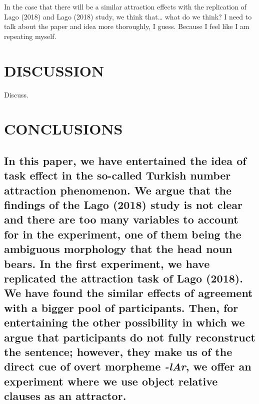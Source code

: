 \documentclass[doc]{apa6}
\begin{document}
In the case that there will be a similar attraction effects with the
replication of Lago (2018) and Lago (2018) study, we think that\ldots{}
what do we think? I need to talk about the paper and idea more
thoroughly, I guess. Because I feel like I am repeating myself.

\section{DISCUSSION}\label{discussion}

Discuss.

\section{CONCLUSIONS}\label{conclusions}

\subsection{\texorpdfstring{In this paper, we have entertained the idea
of task effect in the so-called Turkish number attraction phenomenon. We
argue that the findings of the Lago (2018) study is not clear and there
are too many variables to account for in the experiment, one of them
being the ambiguous morphology that the head noun bears. In the first
experiment, we have replicated the attraction task of Lago (2018). We
have found the similar effects of agreement with a bigger pool of
participants. Then, for entertaining the other possibility in which we
argue that participants do not fully reconstruct the sentence; however,
they make us of the direct cue of overt morpheme \emph{-lAr}, we offer
an experiment where we use object relative clauses as an
attractor.}{In this paper, we have entertained the idea of task effect in the so-called Turkish number attraction phenomenon. We argue that the findings of the Lago (2018) study is not clear and there are too many variables to account for in the experiment, one of them being the ambiguous morphology that the head noun bears. In the first experiment, we have replicated the attraction task of Lago (2018). We have found the similar effects of agreement with a bigger pool of participants. Then, for entertaining the other possibility in which we argue that participants do not fully reconstruct the sentence; however, they make us of the direct cue of overt morpheme -lAr, we offer an experiment where we use object relative clauses as an attractor.}}\label{in-this-paper-we-have-entertained-the-idea-of-task-effect-in-the-so-called-turkish-number-attraction-phenomenon.-we-argue-that-the-findings-of-the-lago-study-is-not-clear-and-there-are-too-many-variables-to-account-for-in-the-experiment-one-of-them-being-the-ambiguous-morphology-that-the-head-noun-bears.-in-the-first-experiment-we-have-replicated-the-attraction-task-of-lago.-we-have-found-the-similar-effects-of-agreement-with-a-bigger-pool-of-participants.-then-for-entertaining-the-other-possibility-in-which-we-argue-that-participants-do-not-fully-reconstruct-the-sentence-however-they-make-us-of-the-direct-cue-of-overt-morpheme--lar-we-offer-an-experiment-where-we-use-object-relative-clauses-as-an-attractor.}
\end{document}
